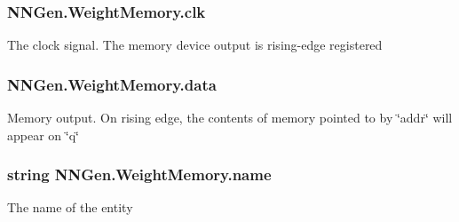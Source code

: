 \hypertarget{class_n_n_gen_1_1_weight_memory_afd016b54cfb5b510f02e5e9d47dd0292}{}
\subsubsection[{clk}]{ N\+N\+Gen.\+Weight\+Memory.\+clk\hspace{0.3cm}{\ttfamily [get]}}\label{class_n_n_gen_1_1_weight_memory_afd016b54cfb5b510f02e5e9d47dd0292}


The clock signal. The memory device output is rising-\/edge registered 

\hypertarget{class_n_n_gen_1_1_weight_memory_a83826d4cceec2993daebe283204e12b6}{}
\subsubsection[{data}]{ N\+N\+Gen.\+Weight\+Memory.\+data\hspace{0.3cm}{\ttfamily [get]}}\label{class_n_n_gen_1_1_weight_memory_a83826d4cceec2993daebe283204e12b6}


Memory output. On rising edge, the contents of memory pointed to by \char`\"{}addr\char`\"{} will appear on \char`\"{}q\char`\"{} 

\hypertarget{class_n_n_gen_1_1_weight_memory_a4b89726fb6f1303d0b898f29d28545cc}{}
\subsubsection[{name}]{\setlength{\rightskip}{0pt plus 5cm}string N\+N\+Gen.\+Weight\+Memory.\+name\hspace{0.3cm}{\ttfamily [get]}}\label{class_n_n_gen_1_1_weight_memory_a4b89726fb6f1303d0b898f29d28545cc}


The name of the entity 

\hypertarget{class_n_n_gen_1_1_weight_memory_a969c7f7f162b75653ff1cb94eb1d11a8}{}
